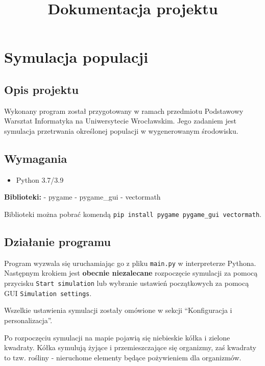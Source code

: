 \documentclass[a4paper]{article}
\title{Dokumentacja projektu}
\begin{document}
\maketitle

\section{Symulacja populacji}\label{symulacja-populacji}

\subsection{Opis projektu}\label{opis-projektu}

Wykonany program został przygotowany w ramach przedmiotu Podstawowy
Warsztat Informatyka na Uniwersytecie Wrocławskim. Jego zadaniem jest
symulacja przetrwania określonej populacji w wygenerowanym środowisku.

\subsection{Wymagania}\label{wymagania}

\begin{itemize}
\itemsep1pt\parskip0pt
\item
  Python 3.7/3.9
\end{itemize}

\textbf{Biblioteki:} - pygame - pygame\_gui - vectormath

Biblioteki można pobrać komendą
\texttt{pip install pygame pygame\_gui vectormath}.

\subsection{Działanie programu}\label{dziaux142anie-programu}

Program wyzwala się uruchamiając go z pliku \texttt{main.py} w
interpreterze Pythona. Następnym krokiem jest \textbf{obecnie
niezalecane} rozpoczęcie symulacji za pomocą przycisku
\texttt{Start simulation} lub wybranie ustawień początkowych za pomocą
GUI \texttt{Simulation settings}.

Wszelkie ustawienia symulacji zostały omówione w sekcji ``Konfiguracja i
personalizacja''.

Po rozpoczęciu symulacji na mapie pojawią się niebieskie kółka i zielone
kwadraty. Kółka symulują żyjące i przemieszczające się organizmy, zaś
kwadraty to tzw. rośliny - nieruchome elementy będące pożywieniem dla
organizmów.
\end{document}

